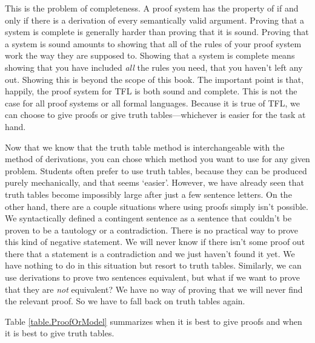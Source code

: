This is the problem of completeness. A proof system has the property of   \label{def:completeness} if and only if there is a derivation of every semantically valid argument. Proving that a system is complete is generally harder than proving that it is sound. Proving that a system is sound amounts to showing that all of the rules of your proof system work the way they are supposed to. Showing that a system is complete means showing that you have included \emph{all} the rules you need, that you haven't left any out. Showing this is beyond the scope of this book. The important point is that, happily, the proof system for TFL is both sound and complete. This is not the case for all proof systems or all formal languages. Because it is true of TFL, we can choose to give proofs or give truth tables---whichever is easier for the task at hand.

Now that we know that the truth table method is interchangeable with the method of derivations, you can chose which method you want to use for any given problem. Students often prefer to use truth tables, because they can be produced  purely mechanically, and that seems `easier'. However, we have already seen that truth tables become impossibly large after just a few sentence letters. On the other hand, there are a couple situations where using proofs simply isn't possible. We syntactically defined a contingent sentence as a sentence that couldn't be proven to be a tautology or a contradiction. There is no practical way to prove this kind of negative statement. We will never know if there isn't some proof out there that a statement is a contradiction and we just haven't found it yet. We have nothing to do in this situation but resort to truth tables. Similarly, we can use derivations to prove two sentences equivalent, but what if we want to prove that they are \emph{not} equivalent? We have no way of proving that we will never find the relevant proof. So we have to fall back on truth tables again.

Table \ref{table.ProofOrModel} summarizes when it is best to give proofs and when it is best to give truth tables. 

